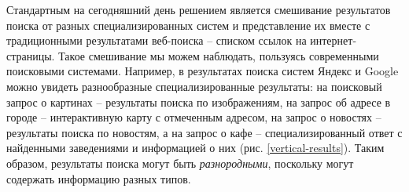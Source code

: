 \documentclass[12pt,a4paper]{report}
\newcommand\figref[1]{(рис. \ref{#1})}
\begin{document}
Стандартным на сегодняшний день решением является смешивание результатов поиска от разных специализированных систем и представление их вместе с традиционными результатами веб-поиска -- списком ссылок на интернет-страницы. Такое смешивание мы можем наблюдать, пользуясь современными поисковыми системами. Например, в результатах поиска систем Яндекс и Google можно увидеть разнообразные специализированные результаты: на поисковый запрос о картинах -- результаты поиска по изображениям, на запрос об адресе в городе --  интерактивную карту с отмеченным адресом, на запрос о новостях -- результаты поиска по новостям, а на запрос о кафе -- специализированный ответ с найденными заведениями и информацией о них \figref{vertical-results}. 
Таким образом, результаты поиска могут быть \emph{разнородными}, поскольку могут содержать информацию разных типов.
\end{document}
